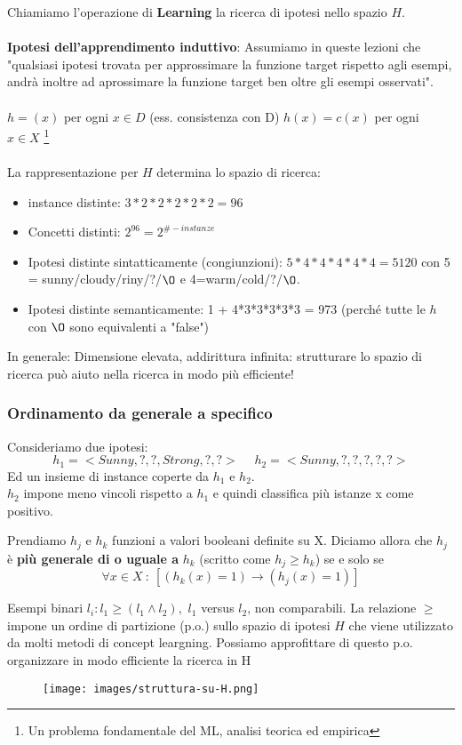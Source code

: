 Chiamiamo l'operazione di \textbf{Learning} la ricerca di ipotesi nello spazio $H$.\\\\
\textbf{Ipotesi dell'apprendimento induttivo}: Assumiamo in queste lezioni che "qualsiasi ipotesi trovata per approssimare la funzione target rispetto agli
esempi, andrà inoltre ad aprossimare la funzione target ben oltre gli esempi osservati".\\\\
$h=(x)$ per ogni $x \in D$ (ess. consistenza con D) \hspace{15pt} $h(x) = c(x)$ per ogni $x \in X$ \footnote{Un problema fondamentale del ML, analisi teorica ed empirica}\\\\
La rappresentazione per $H$ determina lo spazio di ricerca:
\begin{itemize}
    \item instance distinte: $3*2*2*2*2*2 = 96$
    \item Concetti distinti: $2^{96} = 2^{\#-instanze}$
    \item Ipotesi distinte sintatticamente (congiunzioni): $5*4*4*4*4*4 = 5120$ con 5 = sunny/cloudy/riny/?/$\O$ e 4=warm/cold/?/$\O$.
    \item Ipotesi distinte semanticamente: 1 + 4*3*3*3*3*3 = 973 (perché tutte le $h$ con $\O$ sono equivalenti a "false")
\end{itemize}
In generale: Dimensione elevata, addirittura infinita: strutturare lo spazio di ricerca può aiuto nella ricerca in modo più efficiente!

\subsubsection{Ordinamento da generale a specifico}
Consideriamo due ipotesi:
$$h_1 = <Sunny, ?, ?, Strong, ?, ?> \hspace{15pt} h_2 = <Sunny, ?, ?, ?, ?, ?>$$
Ed un insieme di instance coperte da $h_1$ e $h_2$.\\
$h_2$ impone meno vincoli rispetto a $h_1$ e quindi classifica più istanze x come positivo.
\begin{definition}
    Prendiamo $h_j$ e $h_k$ funzioni a valori booleani definite su X. Diciamo allora che $h_j$ è \textbf{più generale di o uguale a} $h_k$ (scritto come $h_j \geq h_k$) se e solo se
    $$\forall x \in X \: :\: [(h_k(x) = 1) \to (h_j(x) = 1)]$$
\end{definition}
\begin{example}
    Esempi binari $l_i: l_1 \geq (l_1 \land l_2),$ $l_1$ versus $l_2$, non comparabili. La relazione $\geq$ impone un 
    ordine di partizione (p.o.) sullo spazio di ipotesi $H$ che viene utilizzato da molti metodi di concept leargning. Possiamo approfittare di questo p.o. organizzare in modo efficiente la ricerca in H
\end{example}
\begin{figure}[h!]
    \centering
    \texttt{[image: images/struttura-su-H.png]}
\end{figure}

